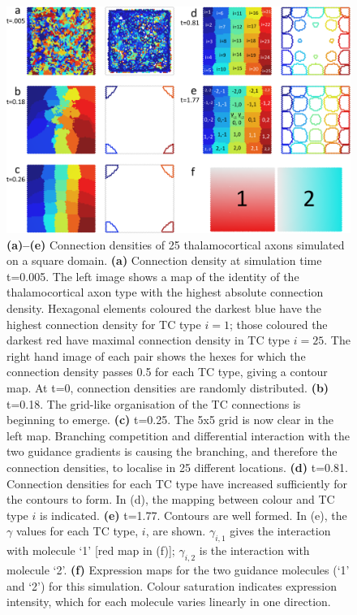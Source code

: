 \documentclass[a4paper,11pt]{article}
\begin{document}
\begin{figure}
\begin{center}
\includegraphics[width=\textwidth]{./Fig_25N2M_square/Fig_25N2M_square.png}
\end{center}
\caption{\textbf{(a)--(e)} Connection densities of 25 thalamocortical axons
  simulated on a square domain. \textbf{(a)} Connection density at simulation
  time t=0.005. The left image shows a map of the identity of the thalamocortical
  axon type with the highest absolute connection density. Hexagonal elements
  coloured the darkest blue have the highest connection density for TC type
  $i=1$; those coloured the darkest red have maximal connection density in TC
  type $i=25$. The right hand image of each pair shows the hexes for which the
  connection density passes 0.5 for each TC type, giving a contour map. At
  t=0, connection densities are randomly distributed. \textbf{(b)} t=0.18. The
  grid-like organisation of the TC connections is beginning to emerge.
  \textbf{(c)} t=0.25. The 5x5 grid is now clear in the left map. Branching
  competition and differential interaction with the two guidance gradients is
  causing the branching, and therefore the connection densities, to localise
  in 25 different locations. \textbf{(d)} t=0.81. Connection densities for
  each TC type have increased sufficiently for the contours to form. In (d),
  the mapping between colour and TC type $i$ is indicated. \textbf{(e)}
  t=1.77. Contours are well formed. In (e), the $\gamma$ values for each TC
  type, $i$, are shown. $\gamma_{i,1}$ gives the interaction with molecule `1'
  [red map in (f)]; $\gamma_{i,2}$ is the interaction with molecule
  `2'. \textbf{(f)} Expression maps for the two guidance molecules (`1' and
  `2') for this simulation. Colour saturation indicates expression intensity,
  which for each molecule varies linearly in one direction.}
\label{fig:sq}
\end{figure}
\end{document}
